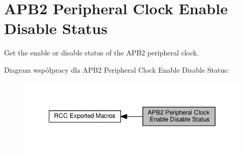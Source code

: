 \hypertarget{group___r_c_c___a_p_b2___peripheral___clock___enable___disable___status}{}\section{A\+P\+B2 Peripheral Clock Enable Disable Status}
\label{group___r_c_c___a_p_b2___peripheral___clock___enable___disable___status}


Get the enable or disable status of the A\+P\+B2 peripheral clock.  


Diagram współpracy dla A\+P\+B2 Peripheral Clock Enable Disable Status\+:\nopagebreak
\begin{figure}[H]
\begin{center}
\leavevmode
\includegraphics[width=349pt]{group___r_c_c___a_p_b2___peripheral___clock___enable___disable___status}
\end{center}
\end{figure}
